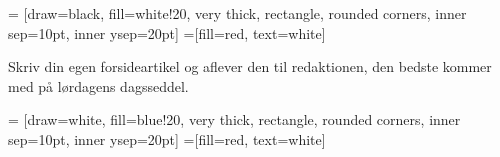 

\begin{minipage}[b]{0.95\linewidth}
\begin{minipage}[t]{0.47\textwidth}
\vspace{3mm}

 = [draw=black, fill=white!20, very thick,
    rectangle, rounded corners, inner sep=10pt, inner ysep=20pt]
 =[fill=red, text=white]

%

Skriv din egen forsideartikel og aflever den til redaktionen, den bedste kommer med på lørdagens dagsseddel.

\end{minipage}
\hfill\begin{minipage}[t]{0.47\textwidth}

\vspace{1mm}
 = [draw=white, fill=blue!20, very thick,
    rectangle, rounded corners, inner sep=10pt, inner ysep=20pt]
 =[fill=red, text=white]

%


\end{minipage}
\end{minipage}
